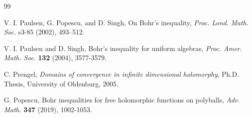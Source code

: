 \documentclass[a4paper,11pt, reqno]{amsart}
\theoremstyle{definition}
\begin{document}
\begin{thebibliography}{99}
	
	
		 {\sc V. I. Paulsen, G. Popescu}, and {\sc D. Singh}, On Bohr's inequality, {\it Proc. Lond. Math. Soc.} s3-85 (2002), 493--512.
	
			 {\sc V. I. Paulsen} and {\sc D. Singh}, Bohr’s inequality for uniform algebras, {\it Proc. Amer. Math. Soc.} {\bf 132} (2004), 3577-3579.
	
			 {\sc C. Prengel}, {\it Domains of convergence in infinite dimensional holomorphy}, Ph.D. Thesis, University of Oldenburg, 2005.
	
	
	
	
		 {\sc G. Popescu}, Bohr inequalities for free holomorphic functions on polyballs, {\it Adv. Math.} {\bf 347} (2019), 1002-1053.
	
	
	
	
	

\end{thebibliography}
\end{document}
